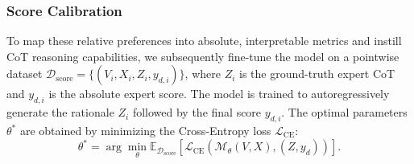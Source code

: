 \documentclass{llmxive}
\begin{document}
\subsubsection{Score Calibration} 
To map these relative preferences into absolute, interpretable metrics and instill CoT reasoning capabilities, we subsequently fine-tune the model on a pointwise dataset $\mathcal{D}_{\text{score}} = \{ (V_i, X_i, Z_i, y_{d,i}) \}$, where $Z_i$ is the ground-truth expert CoT and $y_{d,i}$ is the absolute expert score. The model is trained to autoregressively generate the rationale $Z_i$ followed by the final score $y_{d,i}$. The optimal parameters $\theta^*$ are obtained by minimizing the Cross-Entropy loss $\mathcal{L}_{\text{CE}}$:
\begin{equation}
    \theta^* = \arg\min_{\theta} \mathbb{E}_{\mathcal{D}_{\text{score}}} \left[ \mathcal{L}_{\text{CE}} \left( \mathcal{M}_{\theta}(V, X), (Z, y_d) \right) \right].
\end{equation}





\end{document}
